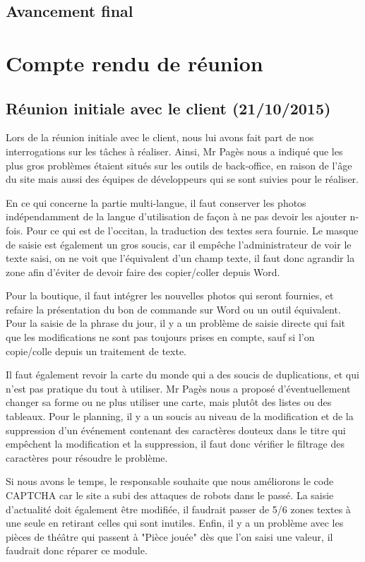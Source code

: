 \documentclass[11pt]{report}
\begin{document}
\subsection{Avancement final}


\section{Compte rendu de réunion}
\subsection{Réunion initiale avec le client (21/10/2015)}
Lors de la réunion initiale avec le client, nous lui avons fait part de nos 
interrogations sur les tâches à réaliser. Ainsi, Mr Pagès nous a indiqué que les
plus gros problèmes étaient situés sur les outils de back-office, en raison de 
l'âge du site mais aussi des équipes de développeurs qui se sont suivies pour
le réaliser. \\
\par En ce qui concerne la partie multi-langue, il faut conserver les photos
indépendamment de la langue d'utilisation de façon à ne pas devoir les ajouter
n-fois. Pour ce qui est de l'occitan, la traduction des textes sera fournie.
Le masque de saisie est également un gros soucis, car il empêche
l'administrateur de voir le texte saisi, on ne voit que l'équivalent d'un
champ texte, il faut donc agrandir la zone afin d'éviter de devoir faire des
copier/coller depuis Word. \\
\par Pour la boutique, il faut intégrer les nouvelles photos qui seront
fournies, et refaire la présentation du bon de commande sur Word ou un outil
équivalent. Pour la saisie de la phrase du jour, il y a un problème de saisie
directe qui fait que les modifications ne sont pas toujours prises en compte,
sauf si l'on copie/colle depuis un traitement de texte. \\
\par Il faut également revoir la carte du monde qui a des soucis de
duplications, et qui n'est pas pratique du tout à utiliser. Mr Pagès nous a proposé
d'éventuellement changer sa forme ou ne plus utiliser une carte, mais plutôt
des listes ou des tableaux. Pour le planning, il y a un soucis au niveau de la
modification et de la suppression d'un événement contenant des caractères
douteux dans le titre qui empêchent la modification et la suppression, il faut
donc vérifier le filtrage des caractères pour résoudre le problème. \\
\par Si nous avons le temps, le responsable souhaite que nous améliorons le code
CAPTCHA car le site a subi des attaques de robots dans le passé.
La saisie d'actualité doit également être modifiée, il faudrait passer de 5/6
zones textes à une seule en retirant celles qui sont inutiles.
Enfin, il y a un problème avec les pièces de théâtre qui passent à "Pièce
jouée" dès que l'on saisi une valeur, il faudrait donc réparer ce module.
\end{document}
